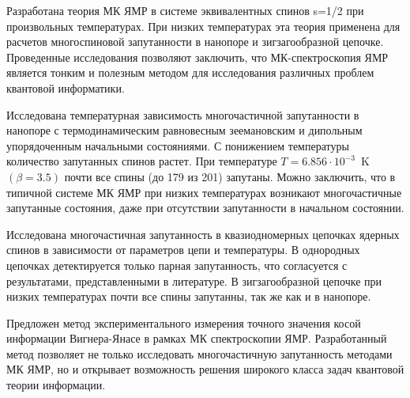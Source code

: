 \item
Разработана теория МК ЯМР в системе эквивалентных спинов s=1/2 при произвольных температурах. При низких температурах эта теория применена для расчетов многоспиновой запутанности в
нанопоре и зигзагообразной цепочке. 
Проведенные исследования позволяют заключить, что МК-спектроскопия ЯМР является тонким и полезным методом для исследования различных проблем квантовой информатики.

\item
Исследована температурная зависимость многочастичной запутанности в нанопоре с термодинамическим равновесным зеемановским и дипольным упорядоченным начальными состояниями.
С понижением температуры количество запутанных спинов растет.
При температуре
$T = 6.856\cdot10^{-3}$~K $(\beta=3.5)$
почти все спины (до 179 из 201) запутаны. 
Можно заключить, что в типичной системе МК ЯМР при низких температурах возникают многочастичные запутанные состояния,
даже при отсутствии запутанности в начальном состоянии.  


\item
Исследована многочастичная запутанность в квазиодномерных цепочках ядерных спинов в зависимости от параметров цепи и температуры.
В однородных цепочках детектируется только парная запутанность, что согласуется с результатами, представленными в литературе.
В зигзагообразной цепочке при низких температурах почти все спины запутанны, так же как и в нанопоре.

\item
Предложен метод экспериментального измерения точного значения косой информации Вигнера-Янасе в рамках МК спектроскопии ЯМР.
Разработанный метод позволяет не только исследовать многочастичную запутанность методами МК ЯМР,
но и открывает возможность решения широкого класса задач квантовой теории информации.
